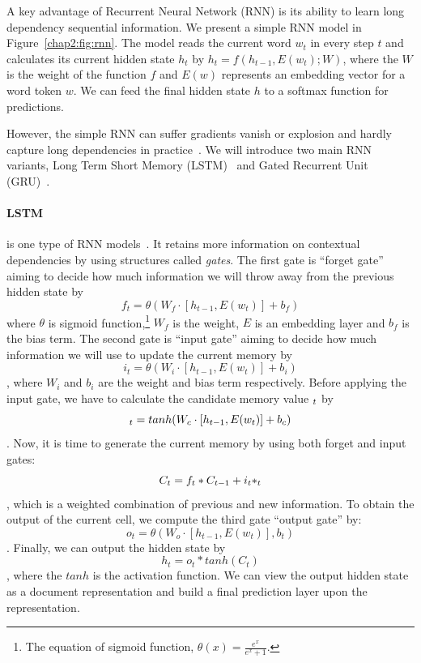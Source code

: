 A key advantage of Recurrent Neural Network (RNN) is its ability to learn long dependency sequential information. 
We present a simple RNN model in Figure~\ref{chap2:fig:rnn}.
The model reads the current word $w_t$ in every step $t$ and calculates its current hidden state $h_t$ by $h_t = f(h_{t-1}, E(w_t); W)$, where the $W$ is the weight of the function $f$ and $E(w)$ represents an embedding vector for a word token $w$.
We can feed the final hidden state $h$ to a softmax function for predictions.

However, the simple RNN can suffer gradients vanish or explosion and hardly capture long dependencies in practice~\cite{pascanu2013difficulty}.
We will introduce two main RNN variants, Long Term Short Memory (LSTM)~\cite{hochreiter1997long} and Gated Recurrent Unit (GRU)~\cite{chung2014empirical}.

\paragraph{LSTM} is one type of RNN models~\cite{hochreiter1997long}. 
It retains more information on contextual dependencies by using structures called \textit{gates}.
The first gate is ``forget gate'' aiming to decide how much information we will throw away from the previous hidden state by 
$$f_t = \theta(W_f \cdot [h_{t-1}, E(w_t)] + b_f)$$
where $\theta$ is sigmoid function,\footnote{The equation of sigmoid function, $\theta(x) = \frac{e^x}{e^x+1}$.} $W_f$ is the weight, $E$ is an embedding layer and $b_f$ is the bias term.
The second gate is ``input gate'' aiming to decide how much information we will use to update the current memory by
$$i_t = \theta(W_i \cdot [h_{t-1}, E(w_t)] + b_i)$$
, where $W_i$ and $b_i$ are the weight and bias term respectively.
Before applying the input gate, we have to calculate the candidate memory value $\title{C}_t$ by $$\title{C}_t = tanh(W_c \cdot [h_{t-1}, E(w_t)] + b_c)$$.
Now, it is time to generate the current memory by using both forget and input gates:
$$C_t = f_t * C_{t-1} + i_t * \title{C}_t$$, which is a weighted combination of previous and new information.
To obtain the output of the current cell, we compute the third gate ``output gate'' by:
$$o_t = \theta(W_o \cdot [h_{t-1}, E(w_t)], b_t)$$.
Finally, we can output the hidden state by $$h_t = o_t * tanh(C_t)$$, where the $tanh$ is the activation function.
We can view the output hidden state as a document representation and build a final prediction layer upon the representation.




